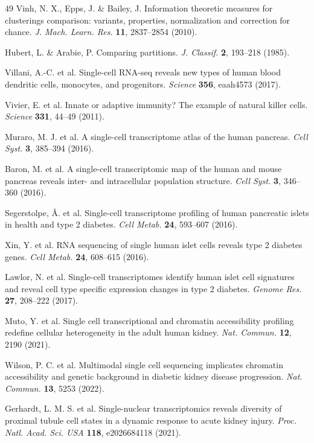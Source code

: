 \documentclass[11pt]{article}
\begin{document}
\begin{thebibliography}{49}
Vinh, N. X., Epps, J. \& Bailey, J. Information theoretic measures for clusterings comparison: variants, properties, normalization and correction for chance. \textit{J. Mach. Learn. Res.} \textbf{11}, 2837--2854 (2010).

Hubert, L. \& Arabie, P. Comparing partitions. \textit{J. Classif.} \textbf{2}, 193--218 (1985).

Villani, A.-C. et al. Single-cell RNA-seq reveals new types of human blood dendritic cells, monocytes, and progenitors. \textit{Science} \textbf{356}, eaah4573 (2017).

Vivier, E. et al. Innate or adaptive immunity? The example of natural killer cells. \textit{Science} \textbf{331}, 44--49 (2011).

Muraro, M. J. et al. A single-cell transcriptome atlas of the human pancreas. \textit{Cell Syst.} \textbf{3}, 385--394 (2016).

Baron, M. et al. A single-cell transcriptomic map of the human and mouse pancreas reveals inter- and intracellular population structure. \textit{Cell Syst.} \textbf{3}, 346--360 (2016).

Segerstolpe, \AA. et al. Single-cell transcriptome profiling of human pancreatic islets in health and type 2 diabetes. \textit{Cell Metab.} \textbf{24}, 593--607 (2016).

Xin, Y. et al. RNA sequencing of single human islet cells reveals type 2 diabetes genes. \textit{Cell Metab.} \textbf{24}, 608--615 (2016).

Lawlor, N. et al. Single-cell transcriptomes identify human islet cell signatures and reveal cell type specific expression changes in type 2 diabetes. \textit{Genome Res.} \textbf{27}, 208--222 (2017).

Muto, Y. et al. Single cell transcriptional and chromatin accessibility profiling redefine cellular heterogeneity in the adult human kidney. \textit{Nat. Commun.} \textbf{12}, 2190 (2021).

Wilson, P. C. et al. Multimodal single cell sequencing implicates chromatin accessibility and genetic background in diabetic kidney disease progression. \textit{Nat. Commun.} \textbf{13}, 5253 (2022).

Gerhardt, L. M. S. et al. Single-nuclear transcriptomics reveals diversity of proximal tubule cell states in a dynamic response to acute kidney injury. \textit{Proc. Natl. Acad. Sci. USA} \textbf{118}, e2026684118 (2021).


\end{thebibliography}
\end{document}
